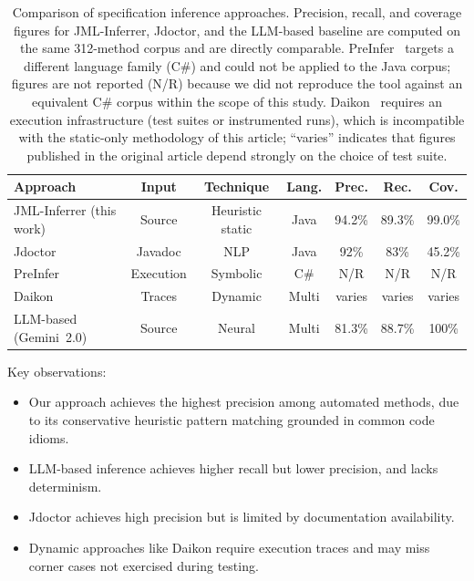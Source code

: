 \documentclass[11pt]{article}
\begin{document}
\begin{table}[ht]
\centering
\caption{Comparison of specification inference approaches. Precision, recall, and coverage figures for JML-Inferrer, Jdoctor, and the LLM-based baseline are computed on the same 312-method corpus and are directly comparable. PreInfer~\cite{preinfer2017} targets a different language family (C\#) and could not be applied to the Java corpus; figures are not reported (N/R) because we did not reproduce the tool against an equivalent C\# corpus within the scope of this study. Daikon~\cite{ernst2007daikon} requires an execution infrastructure (test suites or instrumented runs), which is incompatible with the static-only methodology of this article; ``varies'' indicates that figures published in the original article depend strongly on the choice of test suite.}
\label{tab:approach-comparison-supp}
\small
\begin{tabular}{lcccccc}
\toprule
\textbf{Approach} & \textbf{Input} & \textbf{Technique} & \textbf{Lang.} & \textbf{Prec.} & \textbf{Rec.} & \textbf{Cov.} \\
\midrule
JML-Inferrer (this work) & Source & Heuristic static & Java & 94.2\% & 89.3\% & 99.0\% \\
Jdoctor~\cite{jdoctor2018} & Javadoc & NLP & Java & 92\% & 83\% & 45.2\% \\
PreInfer~\cite{preinfer2017} & Execution & Symbolic & C\# & N/R & N/R & N/R \\
Daikon~\cite{ernst2007daikon} & Traces & Dynamic & Multi & varies & varies & varies \\
LLM-based (Gemini~2.0) & Source & Neural & Multi & 81.3\% & 88.7\% & 100\% \\
\bottomrule
\end{tabular}
\end{table}

Key observations:
\begin{itemize}
    \item Our approach achieves the highest precision among automated methods, due to its conservative heuristic pattern matching grounded in common code idioms.
    \item LLM-based inference achieves higher recall but lower precision, and lacks determinism.
    \item Jdoctor achieves high precision but is limited by documentation availability.
    \item Dynamic approaches like Daikon require execution traces and may miss corner cases not exercised during testing.
\end{itemize}



\end{document}
